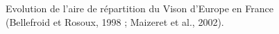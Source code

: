 \documentclass[
  letterpaper,
  DIV=11,
  numbers=noendperiod]{scrreprt}
\begin{document}
\begin{figure}


\caption{\label{fig-declin-fr}Evolution de l'aire de répartition du
Vison d'Europe en France (Bellefroid et Rosoux, 1998 ; Maizeret et al.,
2002).}

\end{figure}%
\end{document}
